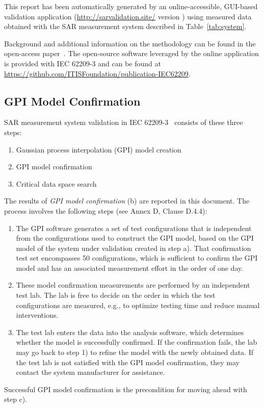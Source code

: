 \documentclass{article}
\begin{document}
This report has been automatically generated by an online-accessible, GUI-based validation application (\url{http://sarvalidation.site/} version ) using measured data obtained with the SAR measurement system described in Table~\ref{tab:system}.

Background and additional information on the methodology can be found in the open-access paper~\cite{gpi-paper}. The open-source software leveraged by the online application is provided with IEC 62209-3 and can be found at
\url{https://github.com/ITISFoundation/publication-IEC62209}.


\subsection{GPI Model Confirmation}\label{sec:procedure}
SAR measurement system validation in IEC 62209-3~\cite{standard} consists of these three steps:

\begin{enumerate}[label=\alph*)]
\item Gaussian process interpolation (GPI) model creation
\item GPI model confirmation
\item Critical data space search
\end{enumerate}

The results of \textit{GPI model confirmation} (b) are reported in this document. The process involves the following steps (see Annex D, Clause D.4.4):

\begin{enumerate}[label=\arabic*)]
\item The GPI software generates a set of test configurations that is independent from the configurations used to construct the GPI model, based on the GPI model of the system under validation created in step a). That confirmation test set encompasses 50 configurations, which is sufficient to confirm the GPI model and has an associated measurement effort in the order of one day.
\item These model confirmation measurements are performed by an independent test lab. The lab is free to decide on the order in which the test configurations are measured, e.g., to optimize testing time and reduce manual interventions.
\item The test lab enters the data into the analysis software, which determines whether the model is successfully confirmed. If the confirmation fails, the lab may go back to step 1) to refine the model with the newly obtained data. If the test lab is not satisfied with the GPI model confirmation, they may contact the system manufacturer for assistance.
\end{enumerate}
Successful GPI model confirmation is the precondition for moving ahead with step c).
\end{document}
